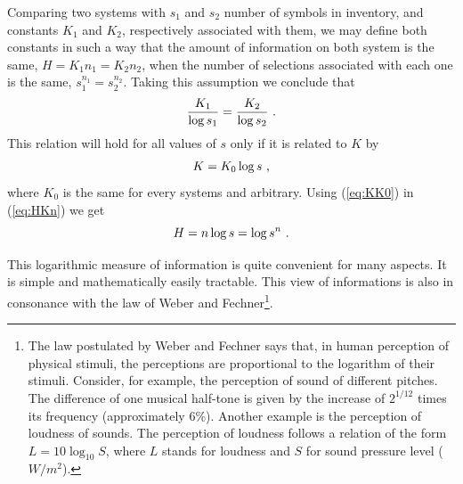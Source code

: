 Comparing two systems with $s_1$ and $s_2$ number of symbols in inventory, and constants $K_1$ and $K_2$, 
respectively associated with them, we may define both constants in such a way that the amount of information on 
both system is the same, $H=K_1 n_1 = K_2 n_2$, when the number of selections associated with each one is the same,
$s_1^{n_1} = s_2^{n_2}$. Taking this assumption we conclude that
\begin{equation}
\frac{K_1}{\log s_1} = \frac{K_2}{\log s_2} \textmd{ .}
\end{equation}
This relation will hold for all values of $s$ only if it is related to $K$ by 
\begin{equation}
K = K_0 \log s \textmd{ ,}
\label{eq:KK0}
\end{equation}
where $K_0$ is the same for every systems and arbitrary. Using (\ref{eq:KK0}) in (\ref{eq:HKn}) we get
\begin{equation}
H = n \log s = \log s^n \textmd{ .}
\end{equation}

This logarithmic measure of information is quite convenient for many aspects. 
It is simple and mathematically easily tractable. This view of informations is also in consonance with 
the law of Weber and Fechner\footnote{The law postulated by Weber and Fechner says that, in human perception 
of physical stimuli, the perceptions are proportional to the logarithm of their stimuli. Consider, for example, 
the perception of sound of different pitches. The difference of one musical half-tone is given by the increase 
of $2^{1/12}$ times its frequency (approximately 6\%). Another example is the perception of loudness of sounds. 
The perception of loudness follows a relation of the form $L = 10 \log_{10} S$, where $L$ stands for loudness 
and $S$ for sound pressure level ($W/m^2$).}. 

